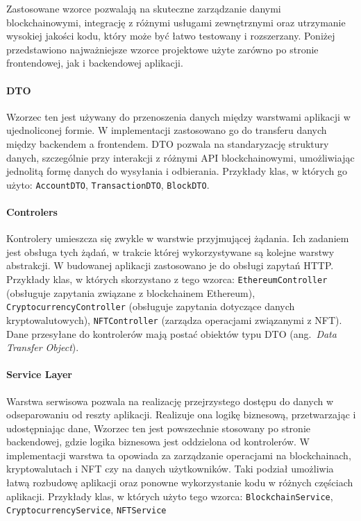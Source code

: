 Zastosowane wzorce pozwalają na skuteczne zarządzanie danymi blockchainowymi, integrację z różnymi usługami zewnętrznymi oraz utrzymanie wysokiej jakości kodu, który może być łatwo testowany i rozszerzany. Poniżej przedstawiono najważniejsze wzorce projektowe użyte zarówno po stronie frontendowej, jak i backendowej aplikacji.

\paragraph{DTO}
Wzorzec ten jest używany do przenoszenia danych między warstwami aplikacji w ujednoliconej formie. W implementacji zastosowano go do transferu danych między backendem a frontendem. DTO pozwala na standaryzację struktury danych, szczególnie przy interakcji z różnymi API blockchainowymi, umożliwiając jednolitą formę danych do wysyłania i odbierania. Przykłady klas, w których go użyto: \texttt{AccountDTO}, \texttt{TransactionDTO}, \texttt{BlockDTO}.

\paragraph{Controlers}
Kontrolery umieszcza się zwykle w warstwie przyjmującej żądania. Ich zadaniem jest obsługa tych żądań, w trakcie której wykorzystywane są kolejne warstwy abstrakcji.
W budowanej aplikacji zastosowano je do obsługi zapytań HTTP. Przykłady klas, w których skorzystano z tego wzorca: \texttt{EthereumController} (obsługuje zapytania związane z blockchainem Ethereum), \texttt{CryptocurrencyController} (obsługuje zapytania dotyczące danych kryptowalutowych), \texttt{NFTController} (zarządza operacjami związanymi z NFT). Dane przesyłane do kontrolerów mają postać obiektów typu DTO (ang.~\emph{Data Transfer Object}).

\paragraph{Service Layer}
Warstwa serwisowa pozwala na realizację przejrzystego dostępu do danych w odseparowaniu od reszty aplikacji. Realizuje ona logikę biznesową, przetwarzając i udostępniając dane, Wzorzec ten jest powszechnie stosowany po stronie backendowej, gdzie logika biznesowa jest oddzielona od kontrolerów. 
W implementacji warstwa ta opowiada za zarządzanie operacjami na blockchainach, kryptowalutach i NFT czy na danych użytkowników.
Taki podział umożliwia łatwą rozbudowę aplikacji oraz ponowne wykorzystanie kodu w różnych częściach aplikacji.
Przykłady klas, w których użyto tego wzorca: \texttt{BlockchainService}, \texttt{CryptocurrencyService}, \texttt{NFTService}

